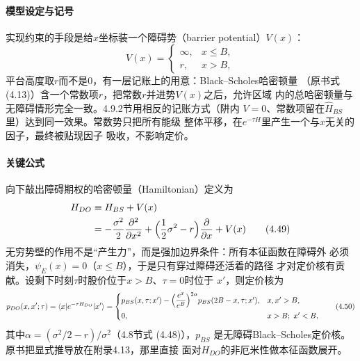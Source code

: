 \paragraph{模型设定与记号}
实现约束的手段是给$x$坐标装一个障碍势（barrier potential）$V(x)$：
\begin{equation*}
V(x)=
\begin{cases}
\infty, & x\leq B,\\
r, & x>B,
\end{cases}
\end{equation*}
平台高度取$r$而不是$0$，有一层记账上的用意：Black--Scholes哈密顿量
（原书式 (4.13)）含一个常数项$r$，把常数$r$并进势$V(x)$之后，允许区域
内的总哈密顿量与无障碍情形完全一致。4.9.2节用相反的记账方式（阱内
$V=0$、常数项留在$\hat{H}_{BS}$里）达到同一效果。常数势只把所有能级
整体平移，在$e^{-\tau H}$里产生一个与$x$无关的因子，最终被贴现因子
吸收，不影响定价。

\paragraph{关键公式}
向下敲出障碍期权的哈密顿量（Hamiltonian）定义为
\begin{align*}
H_{DO}&\equiv H_{BS}+V(x)\\
&=-\frac{\sigma^{2}}{2}\frac{\partial^{2}}{\partial x^{2}}
+\Bigl(\frac{1}{2}\sigma^{2}-r\Bigr)\frac{\partial}{\partial x}+V(x)
\tag{4.49}
\end{align*}
无穷势壁的作用不是“产生力”，而是强加边界条件：所有本征函数在障碍外
必须消失，$\psi_E(x)=0$（$x\leq B$），于是只有穿过障碍还活着的路径
才对定价核有贡献。设剩下时刻$\tau$时股价位于$x>B$、$\tau=0$时位于
$x'$，则定价核为
\begin{equation*}
p_{DO}(x,x';\tau)=\langle x\vert e^{-\tau H_{DO}}\vert x'\rangle
=\begin{cases}
p_{BS}(x,\tau;x')-\Bigl(\dfrac{e^{x}}{e^{B}}\Bigr)^{2\alpha}
p_{BS}(2B-x,\tau;x'), & x,x'>B,\\[6pt]
0, & x>B;\ x'<B,
\end{cases}
\tag{4.50}
\end{equation*}
其中$\alpha=(\sigma^{2}/2-r)/\sigma^{2}$（4.8节式 (4.48)），$p_{BS}$
是无障碍Black--Scholes定价核。原书把显式推导放在附录4.13，那里直接
面对$H_{DO}$的非厄米性做本征函数展开。

